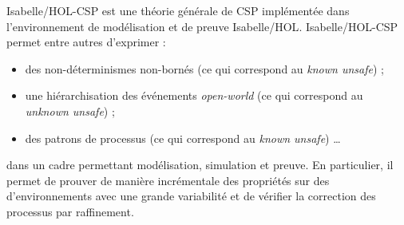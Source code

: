 \documentclass[a4paper,10pt]{article}
\begin{document}
Isabelle/HOL-CSP\cite{HOL-CSP-AFP} est une théorie générale de CSP
implémentée dans l'environnement de modélisation et de preuve Isabelle/HOL\cite{nipkow.ea:isabelle:2002}.
Isabelle/HOL-CSP permet entre autres d'exprimer :
\begin{itemize}
\item
  des non-déterminismes non-bornés
  (ce qui correspond au \emph{known unsafe}) ; 
\item
  une hiérarchisation des événements \emph{open-world}
  (ce qui correspond au \emph{unknown unsafe}) ;
\item
  des patrons de processus (ce qui correspond au \emph{known unsafe}) \ldots
\end{itemize}
dans un cadre permettant modélisation, simulation et preuve.
En particulier, il permet de prouver de manière incrémentale des propriétés sur des d'environnements
avec une grande variabilité et de vérifier la correction des processus par raffinement.

\end{document}
